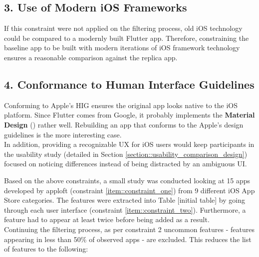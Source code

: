 \subsection*{3. Use of Modern iOS Frameworks}
If this constraint were not applied on the filtering process, old iOS technology could be compared to a modernly built Flutter app. 
Therefore, constraining the baseline app to be built with modern iterations of iOS framework technology ensures a reasonable comparison 
against the replica app.\\


\subsection*{4. Conformance to Human Interface Guidelines}
Conforming to Apple's HIG ensures the original app looks native to the iOS platform.
Since Flutter comes from Google, it probably implements the \textbf{Material Design} (\cite{Google2021}) rather well. Rebuilding an app that conforms to the Apple's design guidelines is the more interesting case.\\
In addition, providing a recognizable UX for iOS users would keep participants in the usability study (detailed in Section \ref{section::usability_comparison_design}) focused on noticing differences instead of 
being distracted by an ambiguous UI.\\
\hfill \break


Based on the above constraints, a small study was conducted looking at 15 apps developed by apploft (constraint \ref{item::constraint_one}) from 9 different iOS App Store categories. 
The features were extracted into Table [initial table] by going through each user interface (constraint \ref{item::constraint_two}).
Furthermore, a feature had to appear at least twice before being added as a result.\\
Continuing the filtering process, as per constraint 2 uncommon features - features appearing
in less than 50\% of observed apps - are excluded. This reduces the list of features to the following:

